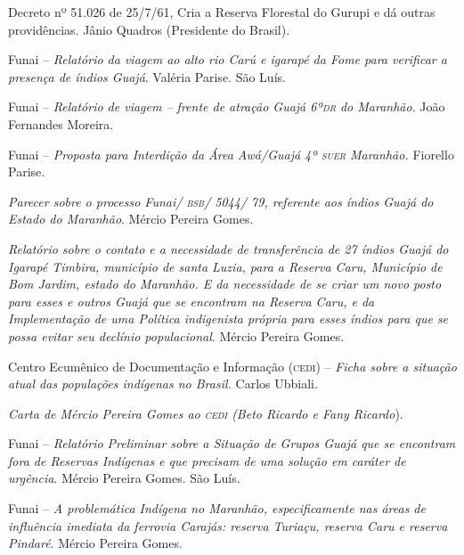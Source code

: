 \begin{itemize}
{\footnotesize
\item[1961] Decreto nº 51.026 de 25/7/61, Cria a Reserva Florestal do
Gurupi e dá outras providências. Jânio Quadros (Presidente do Brasil).

\item[1973] Funai -- \emph{Relatório da viagem ao alto rio Carú e
igarapé da Fome para verificar a presença de índios Guajá}. Valéria
Parise. São Luís.

\item[1973] Funai -- \emph{Relatório de viagem -- frente de atração
Guajá 6ª\textsc{dr} do Maranhão}. João Fernandes Moreira.

\item[1973] Funai -- \emph{Proposta para Interdição da Área Awá/Guajá
4ª \textsc{suer} Maranhão.} Fiorello Parise.

\item[1980] \emph{Parecer sobre o processo Funai/ \textsc{bsb}/ 5044/ 79,
referente aos índios Guajá do Estado do Maranhão}. Mércio Pereira Gomes.

\item[1980] \emph{Relatório sobre o contato e a necessidade de
transferência de 27 índios Guajá do Igarapé Timbira, município de santa
Luzia, para a Reserva Caru, Município de Bom Jardim, estado do Maranhão.
E da necessidade de se criar um novo posto para esses e outros Guajá que
se encontram na Reserva Caru, e da Implementação de uma Política
indigenista própria para esses índios para que se possa evitar seu
declínio populacional}. Mércio Pereira Gomes.

\item[1980] Centro Ecumênico de Documentação e Informação (\textsc{cedi}) --
\emph{Ficha sobre a situação atual das populações indígenas no Brasil.}
Carlos Ubbiali.

\item[1980] \emph{Carta de Mércio Pereira Gomes ao \textsc{cedi} (Beto Ricardo
e Fany Ricardo}).

\item[1981] Funai -- \emph{Relatório Preliminar sobre a Situação de
Grupos Guajá que se encontram fora de Reservas Indígenas e que precisam
de uma solução em caráter de urgência}. Mércio Pereira Gomes. São Luís.

\item[1982] Funai -- \emph{A problemática Indígena no Maranhão,
especificamente nas áreas de influência imediata da ferrovia Carajás:
reserva Turiaçu, reserva Caru e reserva Pindaré}. Mércio Pereira Gomes.

}
\end{itemize}
